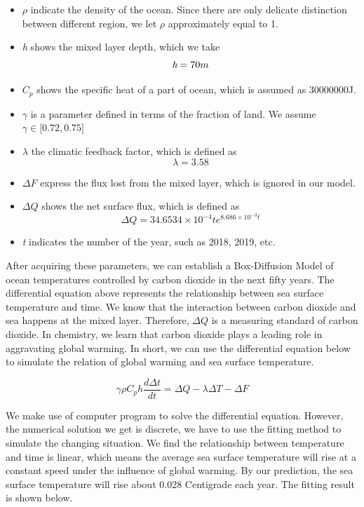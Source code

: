 \documentclass{mcmthesis}
\begin{document}
\begin{itemize}
	\item $\rho$ indicate the density of the ocean. Since there are only delicate distinction between different region, we let $\rho$ approximately equal to 1. 
	\item \emph{h} shows the mixed layer depth, which we take
		\begin{equation*}
		\emph{h}  = 70m
		\end {equation*}
	\item $C_p$ shows the specific heat of a part of ocean, which is assumed as 30000000J.
	\item $\gamma$ is a parameter defined in terms of the fraction of land. We assume $\gamma \in \big[0.72,0.75\big]$ 
	\item $\lambda$ the climatic feedback factor, which is defined as 
		\begin{equation*}
		\lambda = 3.58
		\end {equation*}
	\item  $\Delta F$ express the flux lost from the mixed layer, which is ignored in our model. 
		
	\item $\Delta Q$ shows the net surface flux, which is defined as
		\begin{equation*}
		\Delta Q = 34.6534 \times 10^{-4}te^{8.686\times 10^{-3}t}
		\end {equation*}
	\item \emph{t} indicates the number of the year, such as 2018, 2019, etc.
\end{itemize}
\par
	After acquiring these parameters, we can establish a Box-Diffusion Model of ocean temperatures controlled by carbon dioxide in the next fifty years. The differential equation above represents the relationship between sea surface temperature and time. We know that the interaction between carbon dioxide and sea happens at the mixed layer. Therefore, $\Delta Q$ is a measuring standard of carbon dioxide. In chemistry, we learn that carbon dioxide plays a leading role in aggravating global warming. In short, we can use the differential equation below to simulate  the relation of global warming and sea surface temperature.

\begin{equation*}\label{set1}
\gamma\rho C_{p} h\frac{d\Delta t}{dt} = \Delta Q - \lambda\Delta T - \Delta F
\end{equation*}
\par
	We make use of computer program to solve the differential equation. However, the numerical solution we get is discrete, we have to use the fitting method to simulate the changing situation. We find the relationship between temperature and time is linear, which means the average sea surface temperature will rise at a constant speed under the influence of global warming. By our prediction, the sea surface temperature will rise about 0.028 Centigrade each year. The fitting result is shown below.
\par
\end{document}
